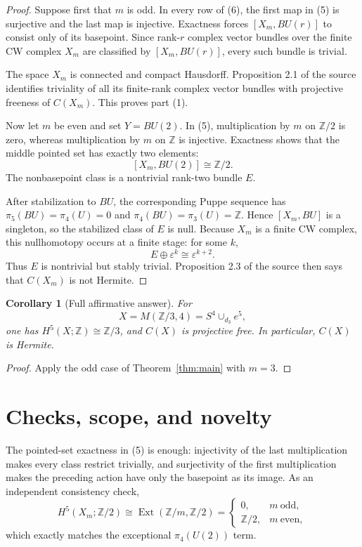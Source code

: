 \documentclass[11pt]{article}
\newtheorem{corollary}[theorem]{Corollary}
\theoremstyle{remark}
\newcommand{\Z}{\mathbb Z}
\newcommand{\Xm}{X_m}
\newcommand{\epsb}{\varepsilon}
\begin{document}
\begin{proof}
Suppose first that \(m\) is odd.  In every row of (6), the first map in
(5) is surjective and the last map is injective.  Exactness forces
\([\Xm,BU(r)]\) to consist only of its basepoint.  Since rank-\(r\) complex
vector bundles over the finite CW complex \(\Xm\) are classified by
\([\Xm,BU(r)]\), every such bundle is trivial.

The space \(\Xm\) is connected and compact Hausdorff.  Proposition 2.1 of
the source identifies triviality of all its finite-rank complex vector
bundles with projective freeness of \(C(\Xm)\).  This proves part (1).

Now let \(m\) be even and set \(Y=BU(2)\).  In (5), multiplication by
\(m\) on \(\Z/2\) is zero, whereas multiplication by \(m\) on \(\Z\) is
injective.  Exactness shows that the middle pointed set has exactly two
elements:
\[
                    [\Xm,BU(2)]\cong\Z/2.                     \tag{7}
\]
The nonbasepoint class is a nontrivial rank-two bundle \(E\).

After stabilization to \(BU\), the corresponding Puppe sequence has
\(\pi_5(BU)=\pi_4(U)=0\) and \(\pi_4(BU)=\pi_3(U)=\Z\).  Hence
\([\Xm,BU]\) is a singleton, so the stabilized class of \(E\) is null.
Because \(\Xm\) is a finite CW complex, this nullhomotopy occurs at a finite
stage: for some \(k\),
\[
                       E\oplus\epsb^k\cong\epsb^{k+2}.         \tag{8}
\]
Thus \(E\) is nontrivial but stably trivial.  Proposition 2.3 of the source
then says that \(C(\Xm)\) is not Hermite.
\end{proof}

\begin{corollary}[Full affirmative answer]
For
\[
                     X=M(\Z/3,4)=S^4\cup_{d_3}e^5,
\]
one has \(H^5(X;\Z)\cong\Z/3\), and \(C(X)\) is projective free.  In
particular, \(C(X)\) is Hermite.
\end{corollary}

\begin{proof}
Apply the odd case of Theorem~\ref{thm:main} with \(m=3\).
\end{proof}

\section{Checks, scope, and novelty}

The pointed-set exactness in (5) is enough: injectivity of the last
multiplication makes every class restrict trivially, and surjectivity of the
first multiplication makes the preceding action have only the basepoint as
its image.  As an independent consistency check,
\[
 H^5(\Xm;\Z/2)
 \cong\operatorname{Ext}(\Z/m,\Z/2)
 =
 \begin{cases}
  0,&m\ \text{odd},\\
  \Z/2,&m\ \text{even},
 \end{cases}
\]
which exactly matches the exceptional \(\pi_4(U(2))\) term.
\end{document}
